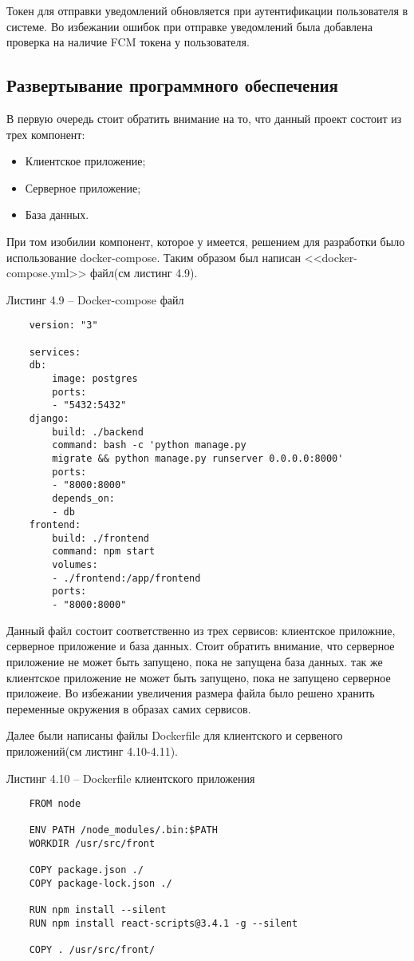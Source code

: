 Токен для отправки уведомлений обновляется при аутентификации пользователя в системе.
Во избежании ошибок при отправке уведомлений была добавлена проверка на наличие FCM токена у пользователя.

\subsection{Развертывание программного обеспечения}
В первую очередь стоит обратить внимание на то, что данный проект состоит из трех компонент:
\begin{itemize}
    \item Клиентское приложение;
    \item Серверное приложение;
    \item База данных.
\end{itemize}

При том изобилии компонент, которое у имеется, решением для разработки было использование docker-compose.
Таким образом был написан <<docker-compose.yml>> файл(см листинг 4.9).

Листинг 4.9 – Docker-compose файл
\begin{lstlisting}
    version: "3"

    services:
    db:
        image: postgres
        ports:
        - "5432:5432"
    django:
        build: ./backend
        command: bash -c 'python manage.py
        migrate && python manage.py runserver 0.0.0.0:8000'
        ports:
        - "8000:8000"
        depends_on:
        - db
    frontend:
        build: ./frontend
        command: npm start
        volumes:
        - ./frontend:/app/frontend
        ports:
        - "8000:8000"
\end{lstlisting}


Данный файл состоит соответственно из трех сервисов: клиентское приложние, серверное приложение и база данных.
Стоит обратить внимание, что серверное приложение не может быть запущено, пока не запущена база данных.
так же клиентское приложение не может быть запущено, пока не запущено серверное приложеие.
Во избежании увеличения размера файла было решено хранить переменные окружения в образах самих сервисов.

Далее были написаны файлы Dockerfile для клиентского и сервеного приложений(см листинг 4.10-4.11).


Листинг 4.10 – Dockerfile клиентского приложения
\begin{lstlisting}
    FROM node

    ENV PATH /node_modules/.bin:$PATH
    WORKDIR /usr/src/front

    COPY package.json ./
    COPY package-lock.json ./

    RUN npm install --silent
    RUN npm install react-scripts@3.4.1 -g --silent

    COPY . /usr/src/front/
\end{lstlisting}

